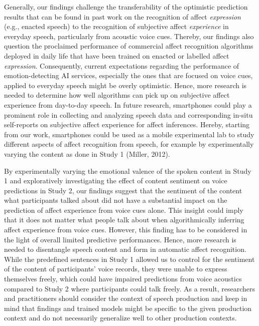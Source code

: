 \documentclass[
  english,
  man,floatsintext]{apa6}
\begin{document}
Generally, our findings challenge the transferability of the optimistic prediction results that can be found in past work on the recognition of affect \emph{expression} (e.g., enacted speech) to the recognition of subjective affect \emph{experience} in everyday speech, particularly from acoustic voice cues. Thereby, our findings also question the proclaimed performance of commercial affect recognition algorithms deployed in daily life that have been trained on enacted or labelled affect \emph{expression}. Consequently, current expectations regarding the performance of emotion-detecting AI services, especially the ones that are focused on voice cues, applied to everyday speech might be overly optimistic. Hence, more research is needed to determine how well algorithms can pick up on subjective affect experience from day-to-day speech.
In future research, smartphones could play a prominent role in collecting and analyzing speech data and corresponding in-situ self-reports on subjective affect experience for affect inferences. Hereby, starting from our work, smartphones could be used as a mobile experimental lab to study different aspects of affect recognition from speech, for example by experimentally varying the content as done in Study 1 (Miller, 2012).

By experimentally varying the emotional valence of the spoken content in Study 1 and exploratively investigating the effect of content sentiment on voice predictions in Study 2, our findings suggest that the sentiment of the content what participants talked about did not have a substantial impact on the prediction of affect experience from voice cues alone. This insight could imply that it does not matter what people talk about when algorithmically inferring affect experience from voice cues. However, this finding has to be considered in the light of overall limited predictive performances. Hence, more research is needed to disentangle speech content and form in automatic affect recognition.
While the predefined sentences in Study 1 allowed us to control for the sentiment of the content of participants' voice records, they were unable to express themselves freely, which could have impaired predictions from voice acoustics compared to Study 2 where participants could talk freely. As a result, researchers and practitioners should consider the context of speech production and keep in mind that findings and trained models might be specific to the given production context and do not necessarily generalize well to other production contexts.
\end{document}
